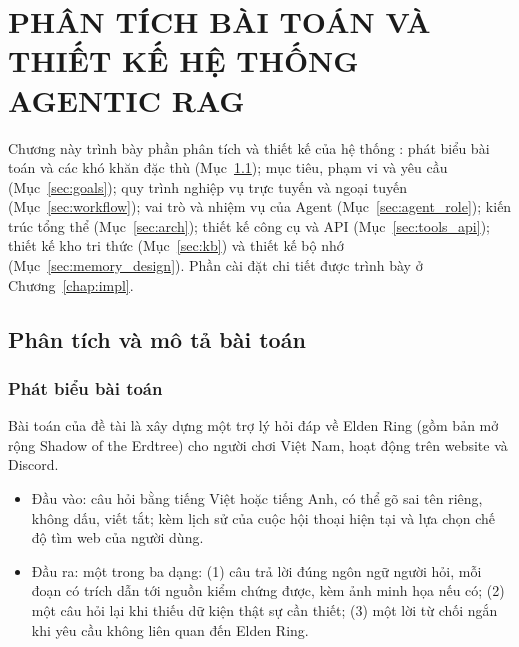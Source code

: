 \chapter{PHÂN TÍCH BÀI TOÁN VÀ THIẾT KẾ HỆ THỐNG AGENTIC RAG}
\label{chap:design}

Chương này trình bày phần phân tích và thiết kế của hệ thống \IB{}: phát biểu bài toán và các khó khăn đặc thù (Mục~\ref{sec:problem}); mục tiêu, phạm vi và yêu cầu (Mục~\ref{sec:goals}); quy trình nghiệp vụ trực tuyến và ngoại tuyến (Mục~\ref{sec:workflow}); vai trò và nhiệm vụ của Agent (Mục~\ref{sec:agent_role}); kiến trúc tổng thể (Mục~\ref{sec:arch}); thiết kế công cụ và API (Mục~\ref{sec:tools_api}); thiết kế kho tri thức (Mục~\ref{sec:kb}) và thiết kế bộ nhớ (Mục~\ref{sec:memory_design}). Phần cài đặt chi tiết được trình bày ở Chương~\ref{chap:impl}.

\section{Phân tích và mô tả bài toán}
\label{sec:problem}

\subsection{Phát biểu bài toán}
\label{sec:problem_statement}

Bài toán của đề tài là xây dựng một trợ lý hỏi đáp về Elden Ring (gồm bản mở rộng Shadow of the Erdtree) cho người chơi Việt Nam, hoạt động trên website và Discord.

\begin{itemize}
    \item Đầu vào: câu hỏi bằng tiếng Việt hoặc tiếng Anh, có thể gõ sai tên riêng, không dấu, viết tắt; kèm lịch sử của cuộc hội thoại hiện tại và lựa chọn chế độ tìm web của người dùng.
    \item Đầu ra: một trong ba dạng: (1) câu trả lời đúng ngôn ngữ người hỏi, mỗi đoạn có trích dẫn tới nguồn kiểm chứng được, kèm ảnh minh họa nếu có; (2) một câu hỏi lại khi thiếu dữ kiện thật sự cần thiết; (3) một lời từ chối ngắn khi yêu cầu không liên quan đến Elden Ring.
\end{itemize}

